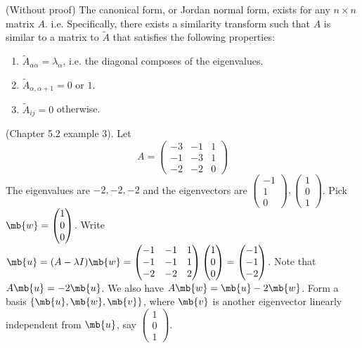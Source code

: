 \documentclass[a4paper]{article}
\begin{document}
\begin{prop}
  (Without proof) The canonical form, or Jordan normal form, exists for any $n\times n$ matrix $A$. i.e. Specifically, there exists a similarity transform such that $A$ is similar to a matrix to $\tilde{A}$ that satisfies the following properties:
  \begin{enumerate}
  \item $\tilde{A}_{\alpha\alpha} = \lambda_\alpha$, i.e. the diagonal composes of the eigenvalues.
  \item $\tilde{A}_{\alpha, \alpha + 1} = 0$ or $1$.
  \item $\tilde{A}_{ij} = 0$ otherwise.
  \end{enumerate}
\end{prop}

\begin{eg}
  (Chapter 5.2 example 3). Let
  \[
  A = \begin{pmatrix}
    -3 & -1 & 1\\
    -1 & -3 & 1\\
    -2 & -2 & 0
  \end{pmatrix}
  \]
  The eigenvalues are $-2, -2, -2$ and the eigenvectors are $
  \begin{pmatrix}
    -1 \\1 \\ 0
  \end{pmatrix}, 
  \begin{pmatrix}
    1 \\ 0 \\1
  \end{pmatrix}$. Pick $\mb{w} = 
  \begin{pmatrix}
    1\\0\\0
  \end{pmatrix}$. Write $\mb{u} = (A - \lambda I)\mb{w} = 
  \begin{pmatrix}
    -1 & -1 & 1\\
    -1 & -1 & 1\\
    -2 & -2 & 2
  \end{pmatrix}
  \begin{pmatrix}
    1\\0\\0
  \end{pmatrix} = 
  \begin{pmatrix}
    -1\\-1\\-2
  \end{pmatrix}$. Note that $A\mb{u} = -2\mb{u}$. We also have $A\mb{w} = \mb{u} - 2\mb{w}$. Form a basis $\{\mb{u}, \mb{w}, \mb{v}\}$, where $\mb{v}$ is another eigenvector linearly independent from $\mb{u}$, say $
  \begin{pmatrix}
    1\\0\\1
  \end{pmatrix}$.


\end{eg}
\end{document}
